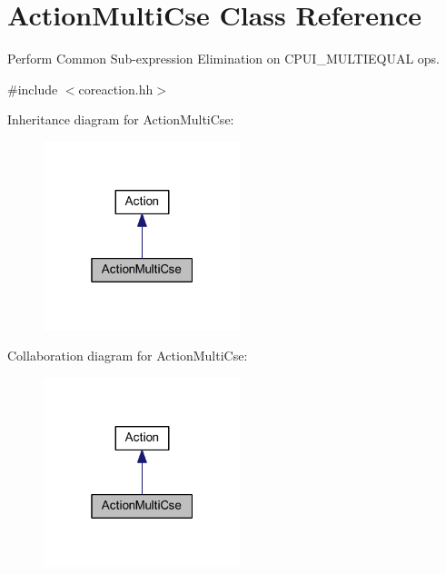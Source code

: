 \hypertarget{class_action_multi_cse}{}\section{Action\+Multi\+Cse Class Reference}
\label{class_action_multi_cse}


Perform Common Sub-\/expression Elimination on C\+P\+U\+I\+\_\+\+M\+U\+L\+T\+I\+E\+Q\+U\+AL ops.  




{\ttfamily \#include $<$coreaction.\+hh$>$}



Inheritance diagram for Action\+Multi\+Cse\+:
\nopagebreak
\begin{figure}[H]
\begin{center}
\leavevmode
\includegraphics[width=163pt]{class_action_multi_cse__inherit__graph}
\end{center}
\end{figure}


Collaboration diagram for Action\+Multi\+Cse\+:
\nopagebreak
\begin{figure}[H]
\begin{center}
\leavevmode
\includegraphics[width=163pt]{class_action_multi_cse__coll__graph}
\end{center}
\end{figure}
